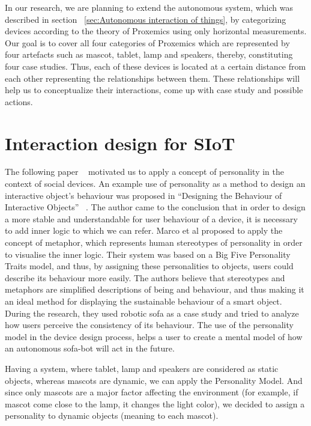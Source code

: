 In our research, we are planning to extend the autonomous system, which was
described in section ~\ref{sec:Autonomous interaction of things}, by categorizing devices
according to the theory of Proxemics using only horizontal measurements.
Our goal is to cover all four categories of Proxemics which are represented by four
artefacts such as mascot, tablet, lamp and speakers, thereby, constituting four case studies.
Thus, each of these devices is located at a certain distance from each other representing
the relationships between them.
These relationships will help us to conceptualize their interactions, come up with case study and possible actions.

\section{Interaction design for SIoT}
\label{sec:Interaction design for SIoT}

The following paper ~\cite{soro2018social} motivated us to apply a concept of
personality in the context of social devices.
An example use of personality as a method to design an interactive object’s behaviour
was proposed in “Designing the Behaviour of Interactive Objects” ~\cite{spadafora2016designing}.
The author came to the conclusion that in order to design a more stable and understandable
for user behaviour of a device, it is necessary to add inner logic to which we can refer.
Marco et al proposed to apply the concept of metaphor, which represents human stereotypes
of personality in order to visualise the inner logic.
Their system was based on a Big Five Personality Traits model, and thus,
by assigning these personalities to objects, users could describe its behaviour more easily.
The authors believe that stereotypes and metaphors are simplified descriptions of being and behaviour,
and thus making it an ideal method for displaying the sustainable behaviour of a smart object.
During the research, they used robotic sofa as a case study and tried to analyze how
users perceive the consistency of its behaviour.
The use of the personality model in the device design process, helps a user to create
a mental model of how an autonomous sofa-bot will act in the future.

Having a system, where tablet, lamp and speakers are considered as static objects,
whereas mascots are dynamic, we can apply the Personality Model.
And since only mascots are a major factor affecting the environment
(for example, if mascot come close to the lamp, it changes the light color), we decided to
assign a personality to dynamic objects (meaning to each mascot).

